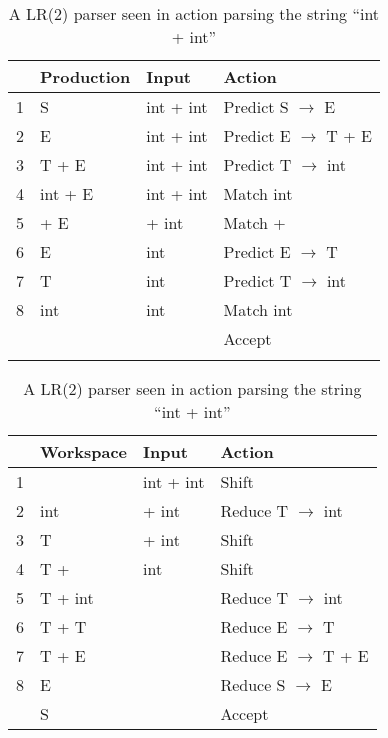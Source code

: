 \begin{table}
	\parbox{.45\linewidth}{
		\centering
    	\begin{tabular}{| l | l | l | l |}                             \hline
      	  & Production & Input      & Action                        \\ \hline
    	1 & S          & int + int  & Predict S $\rightarrow$ E     \\ 
    	2 & E          & int + int  & Predict E $\rightarrow$ T + E \\ 
    	3 & T + E      & int + int  & Predict T $\rightarrow$ int   \\
    	4 & int + E    & int + int  & Match int                     \\ 
    	5 & + E        & + int      & Match +                       \\ 
    	6 & E          & int        & Predict E $\rightarrow$ T     \\ 
    	7 & T          & int        & Predict T $\rightarrow$ int   \\
    	8 & int        & int        & Match int                     \\ 
      	  &            &            & Accept                        \\ \hline
      	\label{table:LL1}
    	\end{tabular}
    \caption{A LL(1) parser seen in action parsing the string ``int + int''}
	}
	\hfill
	\parbox{.45\linewidth}{
		\centering
    	\begin{tabular}{| l | l | l | l |}                              \hline
     	  & Workspace  & Input      & Action                         \\ \hline
    	1 &            & int + int  & Shift                          \\ 
    	2 & int        & + int      & Reduce T $\rightarrow$ int     \\ 
    	3 & T          & + int      & Shift                          \\
    	4 & T +        & int        & Shift                          \\ 
    	5 & T + int    &            & Reduce T $\rightarrow$ int     \\ 
   	 	6 & T + T      &            & Reduce E $\rightarrow$ T       \\ 
   		7 & T + E      &            & Reduce E $\rightarrow$ T + E   \\
    	8 & E          &            & Reduce S $\rightarrow$ E       \\ 
      	  & S          &            & Accept                         \\ \hline
    	\end{tabular}
    \label{table:LR2}
    \caption{A LR(2) parser seen in action parsing the string ``int + int''}
    }
\end{table}

